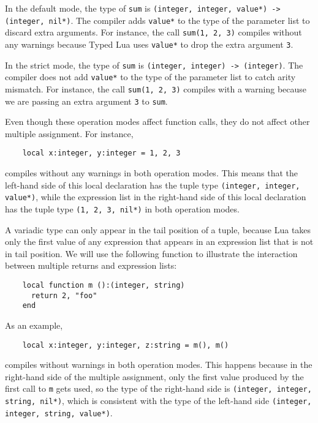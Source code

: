 In the default mode, the type of \texttt{sum} is
\texttt{(integer, integer, value*) -> (integer, nil*)}.
The compiler adds \texttt{value*} to the type of the parameter list
to discard extra arguments.
For instance, the call \texttt{sum(1, 2, 3)} compiles without any
warnings because Typed Lua uses \texttt{value*} to drop the extra
argument \texttt{3}.

In the strict mode, the type of \texttt{sum} is
\texttt{(integer, integer) -> (integer)}.
The compiler does not add \texttt{value*} to the type of the parameter
list to catch arity mismatch.
For instance, the call \texttt{sum(1, 2, 3)} compiles with a warning
because we are passing an extra argument \texttt{3} to \texttt{sum}.

Even though these operation modes affect function calls, they do not
affect other multiple assignment.
For instance,
\begin{verbatim}
    local x:integer, y:integer = 1, 2, 3
\end{verbatim}
compiles without any warnings in both operation modes.
This means that the left-hand side of this local declaration has the
tuple type \texttt{(integer, integer, value*)}, while the expression
list in the right-hand side of this local declaration has the
tuple type \texttt{(1, 2, 3, nil*)} in both operation modes.

A variadic type can only appear in the tail position of a tuple,
because Lua takes only the first value of any expression that appears
in an expression list that is not in tail position.
We will use the following function to illustrate the interaction
between multiple returns and expression lists:
\begin{verbatim}
    local function m ():(integer, string)
      return 2, "foo"
    end
\end{verbatim}

As an example,
\begin{verbatim}
    local x:integer, y:integer, z:string = m(), m()
\end{verbatim}
compiles without warnings in both operation modes.
This happens because in the right-hand side of the multiple
assignment, only the first value produced by the first call
to \texttt{m} gets used, so the type of the right-hand side
is \texttt{(integer, integer, string, nil*)}, which is
consistent with the type of the left-hand side
\texttt{(integer, integer, string, value*)}.

